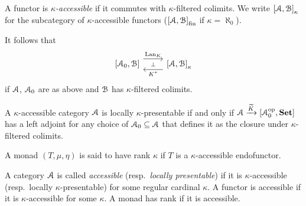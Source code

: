 \documentclass[a4paper,11pt,oneside,openany]{scrbook}
\begin{document}
\begin{defn}
	A functor is \emph{$\kappa$-accessible} if it commutes with $\kappa$-filtered colimits. We write $\left[\operatorname{\mathcal{A}},\operatorname{\mathcal{B}}\right]_\kappa$ for the subcategory of $\kappa$-accessible functors ($\left[\operatorname{\mathcal{A}},\operatorname{\mathcal{B}}\right]_{\text{fin}}$ if $\kappa=\aleph_0$).
\end{defn}
It follows that
\[
	\begin{tikzcd}
		\left[\A_0,\B\right]\ar[r, shift left=1.5ex,"\Lan_K",""{name=A, below}] & \left[\A,\B\right]_\kappa\ar[l, shift left=1.5ex, "K^*",""{name=B,above}] \ar[from=A, to=B, "\perp"description]
	\end{tikzcd}
\]
if $\operatorname{\mathcal{A}}$, $\operatorname{\mathcal{A}}_0$ are as above and $\operatorname{\mathcal{B}}$ has $\kappa$-filtered colimits.
\begin{rmk}
	A $\kappa$-accessible category $\operatorname{\mathcal{A}}$ is locally $\kappa$-presentable if and only if $\operatorname{\mathcal{A}}\xrightarrow{\widetilde{K}}\left[\operatorname{\mathcal{A}}_0^{\operatorname{\text{op}}},{\normalfont\textbf{Set}}\right]$ has a left adjoint for any choice of $\operatorname{\mathcal{A}}_0\subseteq\operatorname{\mathcal{A}}$ that defines it as the closure under $\kappa$-filtered colimits.
\end{rmk}
\begin{defn}
	A monad $(T,\mu,\eta)$ is said to have rank $\kappa$ if $T$ is a $\kappa$-accessible endofunctor.
\end{defn}
\begin{defn}
	A category $\operatorname{\mathcal{A}}$ is called \emph{accessible} (resp.\ \emph{locally presentable}) if it is $\kappa$-accessible (resp.\ locally $\kappa$-presentable) for some regular cardinal $\kappa$. A functor is accessible if it is $\kappa$-accessible for some $\kappa$. A monad has rank if it is accessible.
\end{defn}
\end{document}
